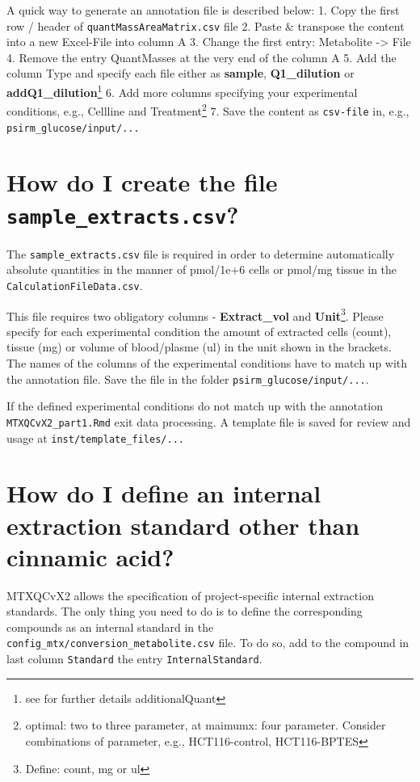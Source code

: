 \documentclass[]{book}
\let\rmarkdownfootnote\footnote%
\def\footnote{\protect\rmarkdownfootnote}
\theoremstyle{definition}
\theoremstyle{definition}
\theoremstyle{definition}
\theoremstyle{remark}
\begin{document}
A quick way to generate an annotation file is described below: 1. Copy
the first row / header of \texttt{quantMassAreaMatrix.csv} file 2. Paste
\& transpose the content into a new Excel-File into column A 3. Change
the first entry: Metabolite -\textgreater{} File 4. Remove the entry
QuantMasses at the very end of the column A 5. Add the column Type and
specify each file either as \textbf{sample}, \textbf{Q1\_dilution} or
\textbf{addQ1\_dilution}\footnote{see for further details
  additionalQuant} 6. Add more columns specifying your experimental
conditions, e.g., Cellline and Treatment\footnote{optimal: two to three
  parameter, at maimumx: four parameter. Consider combinations of
  parameter, e.g., HCT116-control, HCT116-BPTES} 7. Save the content as
\texttt{csv-file} in, e.g., \texttt{psirm\_glucose/input/...}

\section{\texorpdfstring{How do I create the file
\texttt{sample\_extracts.csv}?}{How do I create the file sample\_extracts.csv?}}\label{createsampleextracts}

The \texttt{sample\_extracts.csv} file is required in order to determine
automatically absolute quantities in the manner of pmol/1e+6 cells or
pmol/mg tissue in the \texttt{CalculationFileData.csv}.

This file requires two obligatory columns - \textbf{Extract\_vol} and
\textbf{Unit}\footnote{Define: count, mg or ul}. Please specify for each
experimental condition the amount of extracted cells (count), tissue
(mg) or volume of blood/plasme (ul) in the unit shown in the brackets.\\
The names of the columns of the experimental conditions have to match up
with the annotation file. Save the file in the folder
\texttt{psirm\_glucose/input/...}.

If the defined experimental conditions do not match up with the
annotation \texttt{MTXQCvX2\_part1.Rmd} exit data processing. A template
file is saved for review and usage at \texttt{inst/template\_files/...}

\section{How do I define an internal extraction standard other than
cinnamic acid?}\label{definternal}

MTXQCvX2 allows the specification of project-specific internal
extraction standards. The only thing you need to do is to define the
corresponding compounds as an internal standard in the
\texttt{config\_mtx/conversion\_metabolite.csv} file. To do so, add to
the compound in last column \texttt{Standard} the entry
\texttt{InternalStandard}.
\end{document}
